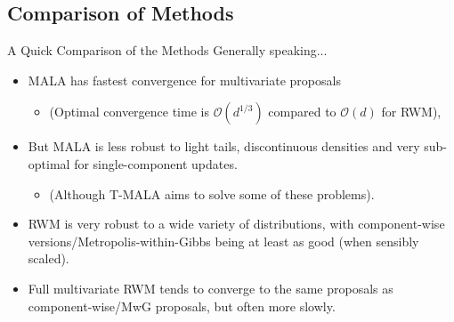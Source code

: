 \documentclass[aspectratio=169]{beamer}
\begin{document}
\subsection{Comparison of Methods}
\begin{frame}{A Quick Comparison of the Methods}
    Generally speaking...
    \begin{itemize}[<+->]
        \item MALA has fastest convergence for multivariate proposals
        \begin{itemize}
            \item (Optimal convergence time is $\mathcal{O}(d^{1/3})$ compared to $\mathcal{O}(d)$ for RWM),
        \end{itemize}
        \item But MALA is less robust to light tails, discontinuous densities and very sub-optimal for single-component updates.
        \begin{itemize}
            \item (Although T-MALA aims to solve some of these problems).
        \end{itemize}
        \item RWM is very robust to a wide variety of distributions, with component-wise versions/Metropolis-within-Gibbs being at least as good (when sensibly scaled).
        \item Full multivariate RWM tends to converge to the same proposals as component-wise/MwG proposals, but often more slowly.
    \end{itemize}
\end{frame}
\end{document}
